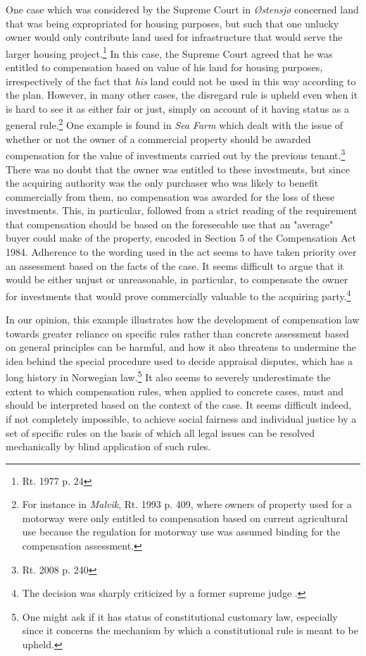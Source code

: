 \documentclass[10pt]{article} %
\begin{document}
One case which was considered by the Supreme Court in \emph{Østensjø} concerned land that was being expropriated for housing purposes, but such that one unlucky owner would only contribute land used for infrastructure that would serve the larger housing project.\footnote{Rt. 1977 p. 24} In this case, the Supreme Court agreed that he was entitled to compensation based on value of his land for housing purposes, irrespectively of the fact that \emph{his} land could not be used in this way according to the plan. However, in many other cases, the disregard rule is upheld even when it is hard to see it as either fair or just, simply on account of it having status as a general rule.\footnote{For instance in \emph{Malvik}, Rt. 1993 p. 409, where owners of property used for a motorway were only entitled to compensation based on current agricultural use because the regulation for motorway use was assumed binding for the compensation assessment.} One example is found in \emph{Sea Farm} which dealt with the issue of whether or not the owner of a commercial property should be awarded compensation for the value of investments carried out by the previous tenant.\footnote{Rt. 2008 p. 240} There was no doubt that the owner was entitled to these investments, but since the acquiring authority was the only purchaser who was likely to benefit commercially from them, no compensation was awarded for the loss of these investments. This, in particular, followed from a strict reading of the requirement that compensation should be based on the foreseeable use that an "average" buyer could make of the property, encoded in Section 5 of the Compensation Act 1984. Adherence to the wording used in the act seems to have taken priority over an assessment based on the facts of the case. It seems difficult to argue that it would be either unjust or unreasonable, in particular, to compensate the owner for investments that would prove commercially valuable to the acquiring party.\footnote{The decision was sharply criticized by a former supreme judge \cite{skog}.}

In our opinion, this example illustrates how the development of compensation law towards greater reliance on specific rules rather than concrete assessment based on general principles can be harmful, and how it also threatens to undermine the idea behind the special procedure used to decide appraisal disputes, which has a long history in Norwegian law.\footnote{One might ask if it has status of constitutional customary law, especially since it concerns the mechanism by which a constitutional rule is meant to be upheld.} It also seems to severely underestimate the extent to which compensation rules, when applied to concrete cases, must and should be interpreted based on the context of the case. It seems difficult indeed, if not completely impossible, to achieve social fairness and individual justice by a set of specific rules on the basis of which all legal issues can be resolved mechanically by blind application of such rules. %
\end{document}
